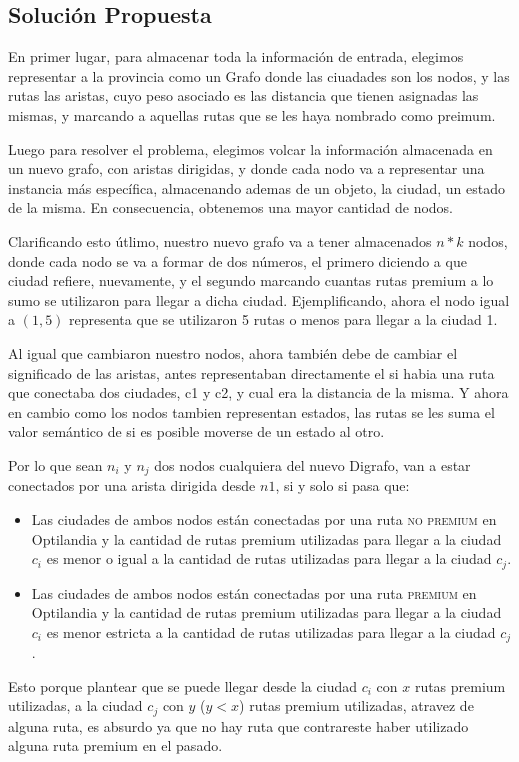 \documentclass{article}
\begin{document}
\subsection{Solución Propuesta}
\par{\hspace{1cm}En primer lugar, para almacenar toda la información de entrada, elegimos representar a la provincia como un Grafo donde las ciuadades son los nodos, y las rutas las aristas, cuyo peso asociado es las distancia que tienen asignadas las mismas, y marcando a aquellas rutas que se les haya nombrado como preimum.}
\medskip
\par{Luego para resolver el problema, elegimos volcar la información almacenada en un nuevo grafo, con aristas dirigidas, y donde cada nodo va a representar una instancia más específica, almacenando ademas de un objeto, la ciudad, un estado de la misma. En consecuencia, obtenemos una mayor cantidad de nodos.}
\par{ Clarificando esto útlimo, nuestro nuevo grafo va a tener almacenados $n*k$ nodos, donde cada nodo se va a formar de dos números, el primero diciendo a que ciudad refiere, nuevamente, y el segundo marcando cuantas rutas premium a lo sumo se utilizaron para llegar a dicha ciudad. Ejemplificando, ahora el nodo igual a $(1,5)$ representa que se utilizaron 5 rutas o menos para llegar a la ciudad 1.}
\medskip
\par{Al igual que cambiaron nuestro nodos, ahora también debe de cambiar el significado de las aristas, antes representaban directamente  el si habia una ruta que conectaba dos ciudades, c1 y c2, y cual era la distancia de la misma. Y ahora en cambio como los nodos tambien representan estados, las rutas se les suma el valor semántico de si es posible moverse de un estado al otro.} \par{Por lo que sean $n_{i}$ y $n_{j}$ dos nodos cualquiera del nuevo Digrafo, van a estar conectados por una arista dirigida desde $n1$, si y solo si pasa que:
\begin{itemize}
\item Las ciudades de ambos nodos están conectadas por una ruta \textsc{no premium} en Optilandia y la cantidad de rutas premium utilizadas para llegar a la ciudad $c_{i}$ es menor o igual a la cantidad de rutas utilizadas para llegar a la ciudad $c_{j}$.

\item Las ciudades de ambos nodos están conectadas por una ruta \textsc{premium} en Optilandia y la cantidad de rutas premium utilizadas para llegar a la ciudad $c_{i}$ es menor estricta a la cantidad de rutas utilizadas para llegar a la ciudad $c_{j}$.

\end{itemize}
 Esto porque plantear que se puede llegar desde la ciudad $c_{i}$ con $x$ rutas premium utilizadas, a la ciudad $c_{j}$ con $y$ ($y<x$) rutas premium utilizadas, atravez de alguna ruta, es absurdo ya que no hay ruta que contrareste haber utilizado alguna ruta premium en el pasado.}
\end{document}
